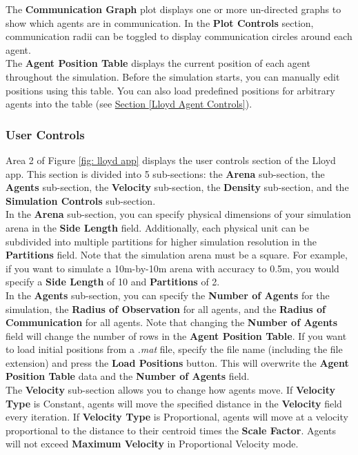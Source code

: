 \documentclass[../CourseManual.tex]{subfiles}
\begin{document}
The \textbf{Communication Graph} plot displays one or more un-directed graphs to show which agents are in communication. In the \textbf{Plot Controls} section, communication radii can be toggled to display communication circles around each agent. \\

The \textbf{Agent Position Table} displays the current position of each agent throughout the simulation. Before the simulation starts, you can manually edit positions using this table. You can also load predefined positions for arbitrary agents into the table (see \hyperref[Lloyd Agent Controls]{Section \ref{Lloyd Agent Controls}}).

\subsubsection{User Controls} \label{Lloyd Controls}
Area 2 of Figure \ref{fig: lloyd app} displays the user controls section of the Lloyd app. This section is divided into 5 sub-sections: the \textbf{Arena} sub-section, the \textbf{Agents} sub-section, the \textbf{Velocity} sub-section, the \textbf{Density} sub-section, and the \textbf{Simulation Controls} sub-section. \\

In the \textbf{Arena} sub-section, you can specify physical dimensions of your simulation arena in the \textbf{Side Length} field. Additionally, each physical unit can be subdivided into multiple partitions for higher simulation resolution in the \textbf{Partitions} field. Note that the simulation arena must be a square. For example, if you want to simulate a 10m-by-10m arena with accuracy to 0.5m, you would specify a \textbf{Side Length} of 10 and \textbf{Partitions} of 2. \\

\label{Lloyd Agent Controls}
In the \textbf{Agents} sub-section, you can specify the \textbf{Number of Agents} for the simulation, the \textbf{Radius of Observation} for all agents, and the \textbf{Radius of Communication} for all agents. Note that changing the \textbf{Number of Agents} field will change the number of rows in the \textbf{Agent Position Table}. If you want to load initial positions from a \textit{.mat} file, specify the file name (including the file extension) and press the \textbf{Load Positions} button. This will overwrite the \textbf{Agent Position Table} data and the \textbf{Number of Agents} field. \\

The \textbf{Velocity} sub-section allows you to change how agents move. If \textbf{Velocity Type} is Constant, agents will move the specified distance in the \textbf{Velocity} field every iteration. If \textbf{Velocity Type} is Proportional, agents will move at a velocity proportional to the distance to their centroid times the \textbf{Scale Factor}. Agents will not exceed \textbf{Maximum Velocity} in Proportional Velocity mode. \\
\end{document}
